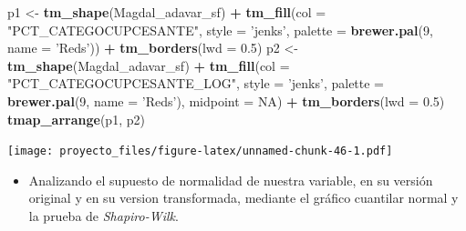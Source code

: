 \documentclass[11pt,]{article}
\newenvironment{Shaded}{\begin{snugshade}}{\end{snugshade}}
\newcommand{\KeywordTok}[1]{\textcolor[rgb]{0.13,0.29,0.53}{\textbf{#1}}}
\newcommand{\DataTypeTok}[1]{\textcolor[rgb]{0.13,0.29,0.53}{#1}}
\newcommand{\DecValTok}[1]{\textcolor[rgb]{0.00,0.00,0.81}{#1}}
\newcommand{\FloatTok}[1]{\textcolor[rgb]{0.00,0.00,0.81}{#1}}
\newcommand{\StringTok}[1]{\textcolor[rgb]{0.31,0.60,0.02}{#1}}
\newcommand{\OtherTok}[1]{\textcolor[rgb]{0.56,0.35,0.01}{#1}}
\newcommand{\OperatorTok}[1]{\textcolor[rgb]{0.81,0.36,0.00}{\textbf{#1}}}
\newcommand{\NormalTok}[1]{#1}
\providecommand{\tightlist}{%
\setlength{\itemsep}{0pt}\setlength{\parskip}{0pt}}
\begin{document}
\begin{Shaded}
\begin{Highlighting}[]
\NormalTok{p1 <-}\StringTok{ }\KeywordTok{tm_shape}\NormalTok{(Magdal_adavar_sf) }\OperatorTok{+}
\StringTok{  }\KeywordTok{tm_fill}\NormalTok{(}\DataTypeTok{col =} \StringTok{"PCT_CATEGOCUPCESANTE"}\NormalTok{, }\DataTypeTok{style =} \StringTok{'jenks'}\NormalTok{, }\DataTypeTok{palette =} \KeywordTok{brewer.pal}\NormalTok{(}\DecValTok{9}\NormalTok{, }\DataTypeTok{name =} \StringTok{'Reds'}\NormalTok{)) }\OperatorTok{+}
\StringTok{  }\KeywordTok{tm_borders}\NormalTok{(}\DataTypeTok{lwd =} \FloatTok{0.5}\NormalTok{)}
\NormalTok{p2 <-}\StringTok{ }\KeywordTok{tm_shape}\NormalTok{(Magdal_adavar_sf) }\OperatorTok{+}
\StringTok{  }\KeywordTok{tm_fill}\NormalTok{(}\DataTypeTok{col =} \StringTok{"PCT_CATEGOCUPCESANTE_LOG"}\NormalTok{, }\DataTypeTok{style =} \StringTok{'jenks'}\NormalTok{,}
          \DataTypeTok{palette =} \KeywordTok{brewer.pal}\NormalTok{(}\DecValTok{9}\NormalTok{, }\DataTypeTok{name =} \StringTok{'Reds'}\NormalTok{), }\DataTypeTok{midpoint =} \OtherTok{NA}\NormalTok{) }\OperatorTok{+}
\StringTok{  }\KeywordTok{tm_borders}\NormalTok{(}\DataTypeTok{lwd =} \FloatTok{0.5}\NormalTok{)}
\KeywordTok{tmap_arrange}\NormalTok{(p1, p2)}
\end{Highlighting}
\end{Shaded}

\texttt{[image: proyecto\_files/figure-latex/unnamed-chunk-46-1.pdf]}

\begin{itemize}
\tightlist
\item
  Analizando el supuesto de normalidad de nuestra variable, en su
  versión original y en su version transformada, mediante el gráfico
  cuantilar normal y la prueba de \emph{Shapiro-Wilk}.
\end{itemize}

\begin{Shaded}
\end{Shaded}
\end{document}
